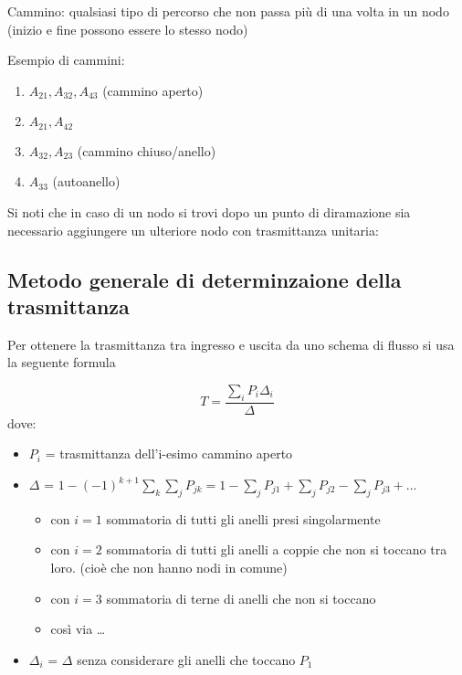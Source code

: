 \begin{definizione}
	Cammino: qualsiasi tipo di percorso che non passa più di una volta in un nodo (inizio e fine possono essere lo stesso nodo)
	
	\begin{center}
	
	\end{center}
	
	Esempio di cammini:
	\begin{enumerate}
		\item $ A_{21},A_{32},A_{43} $ (cammino aperto)
		\item $ A_{21},A_{42} $
		\item $ A_{32},A_{23} $ (cammino chiuso/anello)
		\item $ A_{33} $ (autoanello)
	\end{enumerate}

		
		
\end{definizione}
\begin{osservazione}
	Si noti che in caso di un nodo si trovi dopo un punto di diramazione sia necessario aggiungere un ulteriore nodo con trasmittanza unitaria:
	\begin{center}
	
	\end{center}
\end{osservazione}

\subsection{Metodo generale di determinzaione della trasmittanza}

Per ottenere la trasmittanza tra ingresso e uscita da uno schema di flusso si usa la seguente formula

\begin{equation*}
	T=\frac{\displaystyle\sum_{i}P_i \Delta_i}{\Delta}
\end{equation*}
dove:
\begin{itemize}
	\item $ P_i $ = trasmittanza dell'i-esimo cammino aperto
	\item $ \Delta $ = $\displaystyle 1-(-1)^{k+1}\sum_k\sum_j P_{jk}=1-\sum_j P_{j1}+\sum_j P_{j2}-\sum_j P_{j3}+\dots $
	\begin{itemize}
		\item con $ i=1 $ sommatoria di tutti gli anelli presi singolarmente
		\item con $ i=2 $ sommatoria di tutti gli anelli a coppie che non si toccano tra loro. (cioè che non hanno nodi in comune)
		\item con $ i=3 $ sommatoria di terne di anelli che non si toccano
		\item così via \dots
	\end{itemize}
	\item $ \Delta_i $ = $ \Delta $ senza considerare gli anelli che toccano $ P_1 $
\end{itemize}

